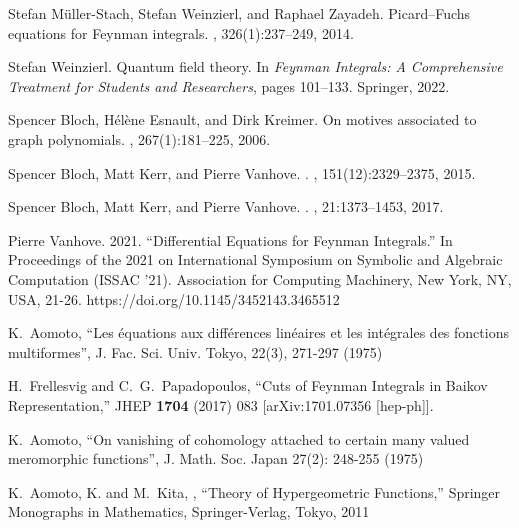 \documentclass[a4paper,12pt]{article}
\numberwithin{equation}{section}
\numberwithin{figure}{section}
\begin{document}
\begin{thebibliography}{99}
Stefan M{\"u}ller-Stach, Stefan Weinzierl, and Raphael Zayadeh.
\newblock Picard--{F}uchs equations for {F}eynman integrals.
,
326(1):237--249, 2014.
\newblock [arXiv:1212.4389]

Stefan Weinzierl.
\newblock Quantum field theory.
\newblock In {\em Feynman Integrals: A Comprehensive Treatment for Students and
  Researchers}, pages 101--133. Springer, 2022.
\newblock [arXiv:2201.03593] 


Spencer Bloch, H{\'e}l{\`e}ne Esnault, and Dirk Kreimer.
\newblock On motives associated to graph polynomials.
,
267(1):181--225, 2006.

Spencer Bloch, Matt Kerr, and Pierre Vanhove.
.
, 151(12):2329--2375, 2015.
\newblock [arXiv:1406.2664] 

Spencer Bloch, Matt Kerr, and Pierre Vanhove.
.
, 21:1373--1453, 2017.
\newblock [arXiv:1601.08181]
  
  Pierre Vanhove. 2021. ``Differential Equations for Feynman Integrals.'' In Proceedings of the 2021 on International Symposium on Symbolic and Algebraic Computation (ISSAC '21). Association for Computing Machinery, New York, NY, USA, 21-26. https://doi.org/10.1145/3452143.3465512

    K.~Aomoto, ``Les \'equations aux diff\'erences
     lin\'eaires et les int\'egrales des fonctions multiformes'',
     J. Fac. Sci. Univ. Tokyo, 22(3), 271-297  (1975)
  
  H.~Frellesvig and C.~G.~Papadopoulos,
  ``Cuts of Feynman Integrals in Baikov Representation,''
  JHEP {\bf 1704} (2017) 083
  [arXiv:1701.07356 [hep-ph]].

   K.~Aomoto, ``On vanishing of cohomology attached to
    certain many valued meromorphic functions'', J. Math. Soc. Japan
    27(2): 248-255 (1975)

     K.~Aomoto, K. and M.~Kita, , ``Theory of Hypergeometric Functions,'' Springer Monographs in Mathematics, Springer-Verlag, Tokyo, 2011
    

\end{thebibliography}
\end{document}
